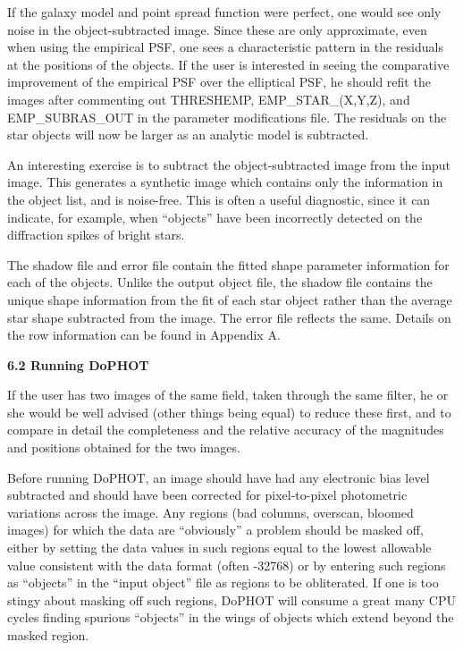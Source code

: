 {If the galaxy model and point spread function were perfect, 
one would see only noise in the object-subtracted image.  
Since these are only approximate, even when using the 
empirical PSF, one sees a characteristic pattern in the
residuals at the positions of the objects.  If the user is interested 
in seeing the comparative improvement of the empirical PSF 
over the elliptical PSF, he should refit the images after commenting
out THRESHEMP, EMP\_STAR\_(X,Y,Z), and 
EMP\_SUBRAS\_OUT in the parameter modifications file.  The 
residuals on the star objects will now be larger as an analytic 
model is subtracted. 
 
An interesting exercise is to subtract the object-subtracted
image from the input image.  This generates a synthetic
image which contains only the information in the object
list, and is noise-free.  This is often a useful diagnostic,
since it can indicate, for example, when ``objects'' have
been incorrectly detected on the diffraction spikes of
bright stars.

The shadow file and error file contain the fitted shape parameter
information for each of the objects.  Unlike the output object file,
the shadow file contains the unique shape information from the 
fit of each star object rather than the average star shape subtracted 
from the image.  The error file reflects the same.  Details on the
row information can be found in Appendix A.

\centerline{\bf 6.2 Running DoPHOT}

If the user has two images of the same field, taken through
the same filter, he or she would be well advised (other
things being equal) to reduce these first, and to compare in
detail the completeness and the relative accuracy of the magnitudes
and positions obtained for the two images.

Before running DoPHOT, an image should have had any
electronic bias level subtracted and should have been
corrected for pixel-to-pixel photometric variations across
the image.  Any regions (bad columns, overscan, bloomed
images) for which the data are ``obviously'' a problem
should be masked off, either by setting the data values in
such regions equal to the lowest allowable value consistent
with the data format (often -32768) or by entering such
regions as ``objects'' in the ``input object'' file as
regions to be obliterated.  If one is too stingy about
masking off such regions, DoPHOT will consume a great many
CPU cycles finding spurious ``objects'' in the wings of
objects which extend beyond the masked region.

}
